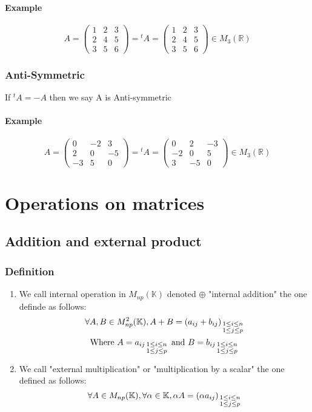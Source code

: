 \documentclass[notitlepage]{math}
\begin{document}
        \paragraph{Example}
        \[ A = \begin{pmatrix}
            1 & 2 & 3 \\
            2 & 4 & 5 \\
            3 & 5 & 6
        \end{pmatrix} = {}^t \! A = 
        \begin{pmatrix}
            1 & 2 & 3 \\
            2 & 4 & 5 \\
            3 & 5 & 6
        \end{pmatrix}
            \in M_{3}(\mathbb{R})\]
    \subsubsection{Anti-Symmetric}
        If $ {}^t \! A = -A $ then we say A is Anti-symmetric
        \paragraph{Example}
        \[ A = \begin{pmatrix}
            0 & -2 & 3 \\
            2 & 0 & -5 \\
            -3 & 5 & 0
        \end{pmatrix} = {}^t \! A = 
        \begin{pmatrix}
            0 & 2 & -3 \\
            -2 & 0 & 5 \\
            3 & -5 & 0
        \end{pmatrix}
            \in M_{3}(\mathbb{R})\]
\section{Operations on matrices}
\subsection{Addition and external product}
\subsubsection{Definition}
\begin{enumerate}
    \item We call internal operation in $M_{np}(\mathbb{K})$ denoted $\oplus$ "internal addition" the one definde as follows:
    \[ \forall A,B \in M^2_{np}(\mathbb{K}),  A + B = (a_{ij} + b_{ij})_{\begin{smallmatrix} 1 \leq i \leq n \\ 1 \leq j \leq p \end{smallmatrix}}\]
    \[ \text{Where } A = {a_{ij}}_{\begin{smallmatrix} 1 \leq i \leq n \\ 1 \leq j \leq p \end{smallmatrix}} \text{ and } B = {b_{ij}}_{\begin{smallmatrix} 1 \leq i \leq n \\ 1 \leq j \leq p \end{smallmatrix}}\]
    \item We call "external multiplication" or "multiplication by a scalar" the one defined as follows:
    \[ \forall A \in M_{np}(\mathbb{K}), \forall \alpha \in \mathbb{K}, \alpha A = (\alpha a_{ij})_{\begin{smallmatrix} 1 \leq i \leq n \\ 1 \leq j \leq p \end{smallmatrix}}\]
\end{enumerate}
\end{document}
